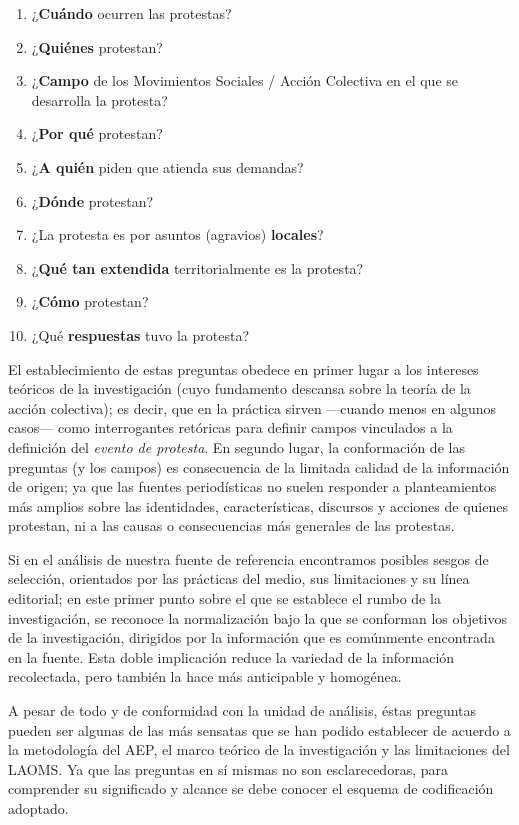 \documentclass[letterpaper, 11pt]{book}
\theoremstyle{definition}
\theoremstyle{remark}
\begin{document}
\begin{enumerate}
    \item ¿\textbf{Cuándo} ocurren las protestas?
    \item ¿\textbf{Quiénes} protestan?
    \item ¿\textbf{Campo} de los Movimientos Sociales / Acción Colectiva en el que se desarrolla la protesta?
    \item ¿\textbf{Por qué} protestan?
    \item ¿\textbf{A quién} piden que atienda sus demandas?
    \item ¿\textbf{Dónde} protestan?
    \item ¿La protesta es por asuntos (agravios) \textbf{locales}?
    \item ¿\textbf{Qué tan extendida} territorialmente es la protesta?
    \item ¿\textbf{Cómo} protestan?
    \item ¿Qué \textbf{respuestas} tuvo la protesta?
\end{enumerate}

El establecimiento de estas preguntas obedece en primer lugar a los intereses teóricos de la investigación (cuyo fundamento descansa sobre la teoría de la acción colectiva); es decir, que en la práctica sirven ---cuando menos en algunos casos--- como interrogantes retóricas para definir campos vinculados a la definición del \emph{evento de protesta}. 
En segundo lugar, la conformación de las preguntas (y los campos) es consecuencia de la limitada calidad de la información de origen; ya que las fuentes periodísticas no suelen responder a planteamientos más amplios sobre las identidades, características, discursos y acciones de quienes protestan, ni a las causas o consecuencias más generales de las protestas.

Si en el análisis de nuestra fuente de referencia encontramos posibles sesgos de selección, orientados por las prácticas del medio, sus limitaciones y su línea editorial; en este primer punto sobre el que se establece el rumbo de la investigación, se reconoce la normalización bajo la que se conforman los objetivos de la investigación, dirigidos por la información que es comúnmente encontrada en la fuente. 
Esta doble implicación reduce la variedad de la información recolectada, pero también la hace más anticipable y homogénea.

A pesar de todo y de conformidad con la unidad de análisis, éstas preguntas pueden ser algunas de las más sensatas que se han podido establecer de acuerdo a la metodología del AEP, el marco teórico de la investigación y las limitaciones del LAOMS. Ya que las preguntas en sí mismas no son esclarecedoras, para comprender su significado y alcance se debe conocer el esquema de codificación adoptado.
\end{document}
